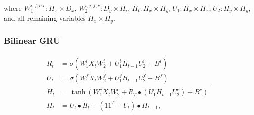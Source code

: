 \documentclass[a4paper,11pt]{article}
\begin{document}
\noindent where  $W_{1}^{i,f,o,c}: H_{x} \times D_{x}$, $W_{2}^{i,j,f,c}:  D_{y} \times H_{y}$, $H_{t}: H_{x} \times H_{y}$, $U_{1}: H_{x} \times H_{x}$, $U_{2}: H_{y} \times H_{y}$, and all remaining variables $H_{x} \times H_{y}$.

\subsubsection{Bilinear GRU} 
\begin{align}
\begin{split}
R_{t} &=\sigma(W_{1}^{i}X_{t}W_{2}^{i} + U_{1}^{i}H_{t-1}U_{2}^{i}  +  B^{i})\\
U_{t} &=\sigma(W_{1}^{f}X_{t}W_{2}^{f} + U_{1}^{f}H_{t-1}U_{2}^{f}  +  B^{f})\\
\tilde{H}_{t} &=\tanh(W_{1}^{c}X_{t}W_{2}^{c} + R_{T} \bullet (U_{1}^{c}H_{t-1}U_{2}^{c})  +  B^{c})\\
H_{t} &= U_{t}\bullet \tilde{H}_{t} + (11^{T} - U_{t})\bullet H_{t-1},
\end{split}.
\end{align}

\noindent 


\end{document}
